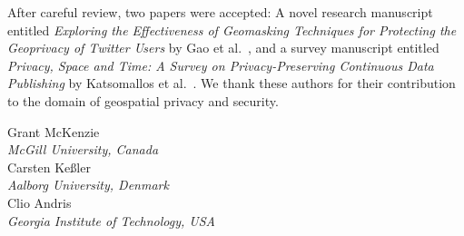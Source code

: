 \documentclass{josised}
\begin{document}
After careful review, two papers were accepted: A novel research manuscript entitled \textit{Exploring the Effectiveness of Geomasking Techniques for Protecting the Geoprivacy of Twitter Users} by Gao et al.~\cite{gao2019exploring}, and a survey manuscript entitled \textit{Privacy, Space and Time: A Survey on Privacy-Preserving Continuous Data Publishing} by Katsomallos et al.~\cite{katsomallos2019privacy}.  We thank these authors for their contribution to the domain of geospatial privacy and security.



\bigskip

\bigskip

\begin{raggedleft}
Grant McKenzie\\
\textit{McGill University, Canada} \\
\bigskip
Carsten Ke{\ss}ler\\
\textit{Aalborg University, Denmark} \\
\bigskip
Clio Andris\\
\textit{Georgia Institute of Technology, USA} \\






\end{raggedleft}
\end{document}
